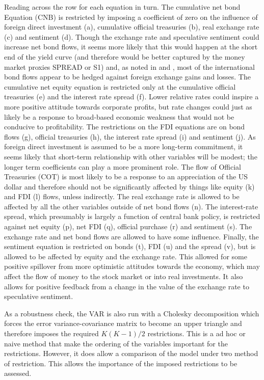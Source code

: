 \documentclass[jrfm,article,accept,moreauthors,pdftex]{Definitions/mdpi}
\begin{document}
 
Reading across the row for each equation in turn. The cumulative net bond Equation (CNB) is restricted by imposing a coefficient of zero on the influence of foreign direct investment (a), cumulative official treasuries (b), real exchange rate (c) and sentiment (d).  Though the exchange rate and speculative sentiment could increase net bond flows, it seems more likely that this would happen at the short end of the yield curve (and therefore would be better captured by the money market proxies SPREAD or S1) and, as noted in \mbox{\citep[p. 3]{Siourounis2004Capital}} and \citep{HauEquity}, most of the international bond flows appear to be hedged against foreign exchange gains and losses.    The cumulative net equity equation is restricted only at the cumulative official treasuries (e) and the interest rate spread (f).  Lower relative rates could inspire a more positive attitude towards corporate profits, but rate changes could just as likely be a response to broad-based economic weakness that would not be conducive to profitability. The restrictions on the FDI equations are on bond flows (g), official treasuries (h), the interest rate spread (i) and sentiment (j).  As foreign direct investment is assumed to be a more long-term commitment, it seems likely that short-term relationship with other variables will be modest; the longer term coefficients can play a more prominent role.   The flow of Official Treasuries (COT) is most likely to be a response to an appreciation of the US dollar and therefore should not be significantly affected by things like equity (k) and FDI (l) flows, unless indirectly.  The real exchange rate is allowed to be affected by all the other variables outside of net bond flows (n).  The interest-rate spread, which presumably is largely a function of central bank policy, is restricted against net equity (p), net FDI (q), official purchase (r) and sentiment (s).  The exchange rate and net bond flows are allowed to have some influence.  Finally, the sentiment equation is restricted on bonds (t), FDI (u) and the spread (v), but is allowed to be affected by equity and the exchange rate.  This allowed for some positive spillover from more optimistic attitudes towards the economy, which may affect the flow of money to the stock market or into real investments.   It also allows for positive feedback from a change in the value of the exchange rate to speculative sentiment. 

As a robustness check, the VAR is also run with a {Cholesky decomposition} which forces the error variance-covariance matrix to become an upper triangle and therefore imposes the required $K(K-1)/2$ restrictions. This is a ad hoc or {naive} method that make the ordering of the variables important for the restrictions. However, it does allow a comparison of the model under two method of restriction.  This allows the importance of the imposed restrictions to be assessed. 
\end{document}
